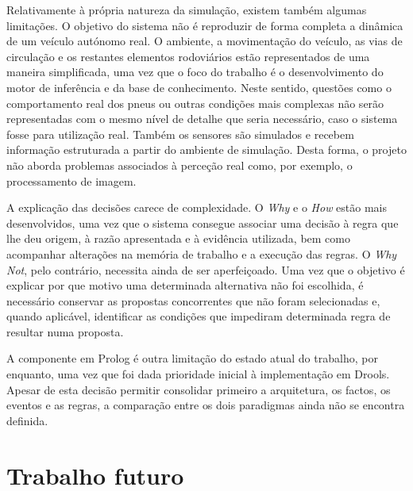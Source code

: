 Relativamente à própria natureza da simulação, existem também algumas
limitações. O objetivo do sistema não é reproduzir de forma completa a
dinâmica de um veículo autónomo real. O ambiente, a movimentação do veículo,
as vias de circulação e os restantes elementos rodoviários estão
representados de uma maneira simplificada, uma vez que o foco do trabalho é o
desenvolvimento do motor de inferência e da base de conhecimento. Neste
sentido, questões como o comportamento real dos pneus ou outras condições mais
complexas não serão representadas com o mesmo nível de detalhe que seria
necessário, caso o sistema fosse para utilização real. Também os sensores são
simulados e recebem informação estruturada a partir do ambiente de simulação.
Desta forma, o projeto não aborda problemas associados à perceção real como,
por exemplo, o processamento de imagem.

A explicação das decisões carece de complexidade. O \emph{Why} e o \emph{How}
estão mais desenvolvidos, uma vez que o sistema consegue associar uma decisão
à regra que lhe deu origem, à razão apresentada e à evidência utilizada, bem
como acompanhar alterações na memória de trabalho e a execução das regras. O
\emph{Why Not}, pelo contrário, necessita ainda de ser aperfeiçoado. Uma vez
que o objetivo é explicar por que motivo uma determinada alternativa não foi
escolhida, é necessário conservar as propostas concorrentes que não foram
selecionadas e, quando aplicável, identificar as condições que impediram
determinada regra de resultar numa proposta.

A componente em Prolog é outra limitação do estado atual do trabalho, por
enquanto, uma vez que foi dada prioridade inicial à implementação em Drools.
Apesar de esta decisão permitir consolidar primeiro a arquitetura, os factos,
os eventos e as regras, a comparação entre os dois paradigmas ainda não se
encontra definida.

\section{Trabalho futuro}
\label{sec:trabalho-futuro}

